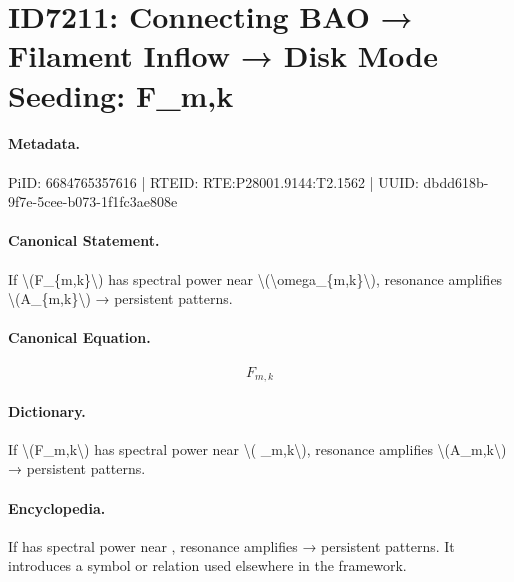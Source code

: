 \section*{ID7211: Connecting BAO → Filament Inflow → Disk Mode Seeding: F\_m,k}
\paragraph{Metadata.}
PiID: 6684765357616 | RTEID: RTE:P28001.9144:T2.1562 | UUID: dbdd618b-9f7e-5cee-b073-1f1fc3ae808e

\paragraph{Canonical Statement.}
If \textbackslash{}(F\_\{m,k\}\textbackslash{}) has spectral power near \textbackslash{}(\textbackslash{}omega\_\{m,k\}\textbackslash{}), resonance amplifies \textbackslash{}(A\_\{m,k\}\textbackslash{}) → persistent patterns.

\paragraph{Canonical Equation.}
\[
F_{m,k}
\]

\paragraph{Dictionary.}
If \textbackslash{}(F\_m,k\textbackslash{}) has spectral power near \textbackslash{}( \_m,k\textbackslash{}), resonance amplifies \textbackslash{}(A\_m,k\textbackslash{}) → persistent patterns.

\paragraph{Encyclopedia.}
If has spectral power near , resonance amplifies → persistent patterns. It introduces a symbol or relation used elsewhere in the framework.
